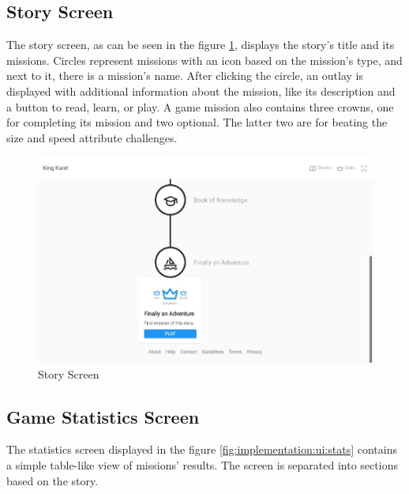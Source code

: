 \subsection{Story Screen}

The story screen, as can be seen in the figure \ref{fig:implementation:ui:story}, displays the story's title and its missions.
Circles represent missions with an icon based on the mission's type, and next to it, there is a mission's name.
After clicking the circle, an outlay is displayed with additional information about the mission, like its description and a button to read, learn, or play.
A game mission also contains three crowns, one for completing its mission and two optional.
The latter two are for beating the size and speed attribute challenges.

\begin{figure}
    \centering
    \includegraphics[width=1\linewidth]{assets/implementation/ui/kingkarel_story_game_mission.jpeg}
    \caption{Story Screen}
    \label{fig:implementation:ui:story}
\end{figure}

\subsection{Game Statistics Screen}

The statistics screen displayed in the figure \ref{fig:implementation:ui:stats} contains a simple table-like view of missions' results.
The screen is separated into sections based on the story.

